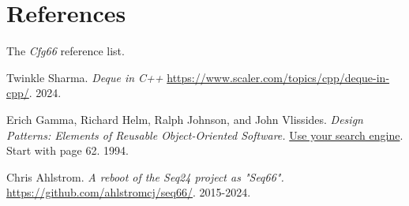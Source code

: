 %
%
%

\section{References}
\label{sec:references}

   The \textsl{Cfg66} reference list.

{\RaggedRight
\begin{thebibliography}{99}

   Twinkle Sharma.
   \emph{Deque in C++}
   \url{https://www.scaler.com/topics/cpp/deque-in-cpp/}.
   2024.

   Erich Gamma, Richard Helm, Ralph Johnson, and John Vlissides.
   \emph{Design Patterns: Elements of Reusable Object-Oriented Software.}
   \url{Use your search engine}.
   Start with page 62.
   1994.


   Chris Ahlstrom.
   \emph{A reboot of the Seq24 project as "Seq66".}
   \url{https://github.com/ahlstromcj/seq66/}.
   2015-2024.

\end{thebibliography}
}

